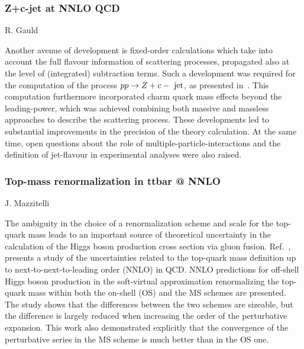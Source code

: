 \documentclass{FBR_Bericht_2025}
\begin{document}
\begin{refsection}
%
\subsubsection{Z+c-jet at NNLO QCD}
\begin{Namen}
R. Gauld
\end{Namen}
%
Another avenue of development is fixed-order calculations which take into account the full flavour information of scattering processes, propagated also at the level of (integrated) subtraction terms. Such a development was required for the computation of the process $pp \to Z + c-{\rm~jet}$, as presented in~. 
%
This computation furthermore incorporated charm quark mass effects beyond the leading-power, which was achieved combining both massive and massless approaches to describe the scattering process.
%
These developments led to substantial improvements in the precision of the theory calculation. At the same time, open questions about the role of multiple-particle-interactions and the definition of jet-flavour in experimental analyses were also raised. %


\subsubsection{Top-mass renormalization in ttbar @ NNLO}
\begin{Namen}
J. Mazzitelli
\end{Namen}
The ambiguity in the choice of a renormalization scheme and scale for
the top-quark mass leads to an important source of theoretical
uncertainty in the calculation of the Higgs boson production cross
section via gluon fusion.  Ref.~\cite{Mazzitelli:2022scc}, presents a
study of the uncertainties related to the top-quark mass definition up
to next-to-next-to-leading order (NNLO) in QCD.  NNLO predictions for
off-shell Higgs boson production in the soft-virtual approximation
renormalizing the top-quark mass within both the on-shell (OS) and the
MS schemes are presented. The study shows that the differences between
the two schemes are sizeable, but the difference is largely reduced
when increasing the order of the perturbative expansion. This work
also demonstrated explicitly that the convergence of the perturbative
series in the MS scheme is much better than in the OS one.
%
\printbibliography[heading=subbibliography]
\end{refsection}


\end{document}
